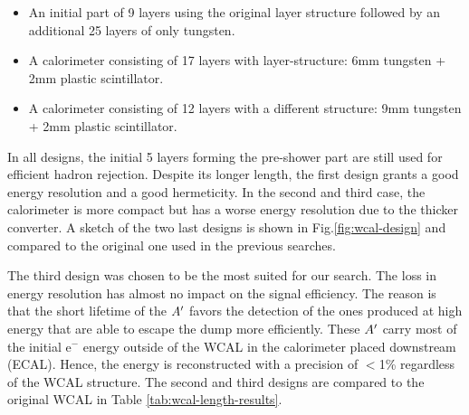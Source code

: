 \begin{itemize}
\item An initial part of 9 layers using the original layer structure followed by an additional 25 layers of only tungsten.
\item A calorimeter consisting of 17 layers with layer-structure: 6mm tungsten + 2mm plastic scintillator.
\item A calorimeter consisting of 12 layers with a different structure: 9mm tungsten + 2mm plastic scintillator.
\end{itemize}

In all designs, the initial 5 layers forming the pre-shower part are still used for efficient hadron rejection. Despite its longer length, the first design grants a good energy resolution and a good hermeticity. In the second and third case, the calorimeter is more compact but has a worse energy resolution due to the thicker converter. A sketch of the two last designs is shown in Fig.\ref{fig:wcal-design} and compared to the original one used in the previous searches.

The third design was chosen to be the most suited for our search. The loss in energy resolution has almost no impact on the signal efficiency. The reason is that the short lifetime of the $A'$ favors the detection of the ones produced at high energy that are able to escape the dump more efficiently. These $A'$ carry most of the initial e$^-$ energy outside of the WCAL in the calorimeter placed downstream (ECAL). Hence, the energy is reconstructed with a precision of $<$1\% regardless of the WCAL structure. The second and third designs are compared to the original WCAL in Table \ref{tab:wcal-length-results}.

